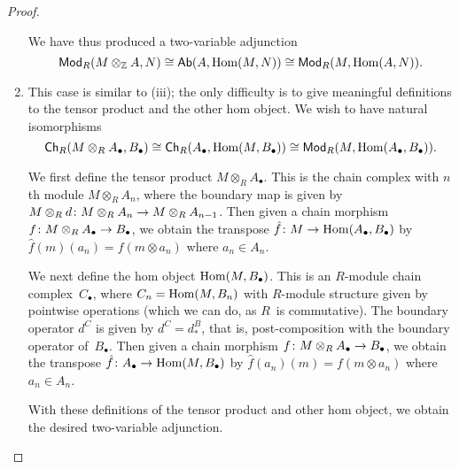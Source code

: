 \documentclass[../../solutions]{subfiles}
\begin{document}
\begin{proof}
\begin{enumerate}[label=(\roman*)]
    We have thus produced a two-variable adjunction
    $$\mathsf{Mod}_{R}(M\otimes_{\mathbb{Z}} A,N) \cong \mathsf{Ab}(A,\operatorname{Hom}(M,N)) \cong
    \mathsf{Mod}_{R}(M,\operatorname{Hom}(A,N)).$$

  \item This case is similar to (iii); the only difficulty is to give
    meaningful definitions to the tensor product and the other hom
    object.  We wish to have natural isomorphisms
    $$\mathsf{Ch}_R(M\otimes_R A_\bullet,B_\bullet) \cong
    \mathsf{Ch}_R(A_\bullet,\operatorname{Hom}(M,B_\bullet)) \cong
    \mathsf{Mod}_{R}(M,\operatorname{Hom}(A_\bullet,B_\bullet)).$$

    We first define the tensor product $M\otimes_R A_\bullet$.  This
    is the chain complex with $n$th module $M\otimes_R A_n$, where the
    boundary map is given by ${M\otimes_R d}\colon{M\otimes_R
      A_n}\to{M\otimes_R A_{n-1}}$.  Then given a chain morphism
    ${f}\colon{M\otimes_R A_\bullet}\to{B_\bullet}$, we obtain the
    transpose ${\hat{f}}\colon{M}\to{\operatorname{Hom}(A_\bullet,B_\bullet)}$ by
    $\hat{f}(m)(a_n)=f(m\otimes a_n)$ where $a_n\in A_n$.

    We next define the hom object $\operatorname{Hom}(M,B_\bullet)$.  This is an
    $R$-module chain complex~$C_\bullet$, where $C_n=\operatorname{Hom}(M,B_n)$ with
    $R$-module structure given by pointwise operations (which we can
    do, as $R$~is commutative).  The boundary operator $d^C$ is given
    by $d^C=d^B_*$, that is, post-composition with the boundary
    operator of~$B_\bullet$.  Then given a chain morphism
    ${f}\colon{M\otimes_R A_\bullet}\to{B_\bullet}$, we obtain the
    transpose ${\hat{f}}\colon{A_\bullet}\to{\operatorname{Hom}(M,B_\bullet)}$ by
    $\hat{f}(a_n)(m)=f(m\otimes a_n)$ where $a_n\in A_n$.

    With these definitions of the tensor product and other hom object,
    we obtain the desired two-variable adjunction.
  \end{enumerate}

\end{proof}
\end{document}
